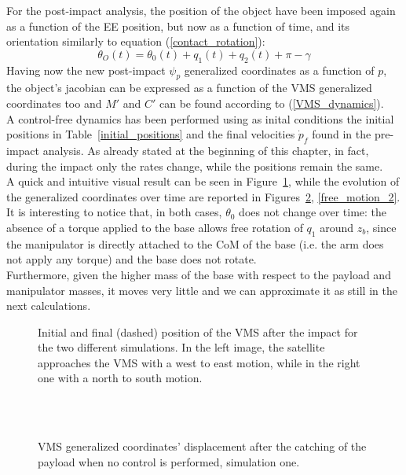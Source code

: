 \documentclass[a4paper,12pt,oneside]{report}
\begin{document}
For the post-impact analysis, the position of the object have been imposed again as a function of the EE position, but now as a function of time, and its orientation similarly to equation (\ref{contact_rotation}):
\begin{equation}
  \theta_O(t)=\theta_0(t)+q_1(t)+q_2(t)+\pi-\gamma
\end{equation}
Having now the new post-impact $\psi_p$ generalized coordinates as a function of $p$, the object's jacobian can be expressed as a function of the VMS generalized coordinates too and $M'$ and $C'$ can be found according to (\ref{VMS_dynamics}).\\
A control-free dynamics has been performed using as inital conditions the initial positions in Table~\ref{initial_positions} and the final velocities $\dot{p}_f$ found in the pre-impact analysis. As already stated at the beginning of this chapter, in fact, during the impact only the rates change, while the positions remain the same.\\
A quick and intuitive visual result can be seen in Figure~\ref{no_control_result}, while the evolution of the generalized coordinates over time are reported in Figures~\ref{free_motion_1}, \ref{free_motion_2}.\\
It is interesting to notice that, in both cases, $\theta_0$ does not change over time: the absence of a torque applied to the base allows free rotation of $q_1$ around $z_b$, since the manipulator is directly attached to the CoM of the base (i.e. the arm does not apply any torque) and the base does not rotate.\\
Furthermore, given the higher mass of the base with respect to the payload and manipulator masses, it moves very little and we can approximate it as still in the next calculations.\\
\begin{figure}[!htb]
  \centering
  \caption{Initial and final (dashed) position of the VMS after the impact for the two different simulations. In the left image, the satellite approaches the VMS with a west to east motion, while in the right one with a north to south motion.}
  \label{no_control_result}
\end{figure}
\begin{figure}[!htb]
  \centering
  \subfloat
  {} \quad
\subfloat
  {} \\
  \subfloat
  {} \quad
  \subfloat
  {}\\
  \subfloat
  {}
  \caption{VMS generalized coordinates' displacement after the catching of the payload when no control is performed, simulation one.}
  \label{free_motion_1}
\end{figure}
\end{document}
